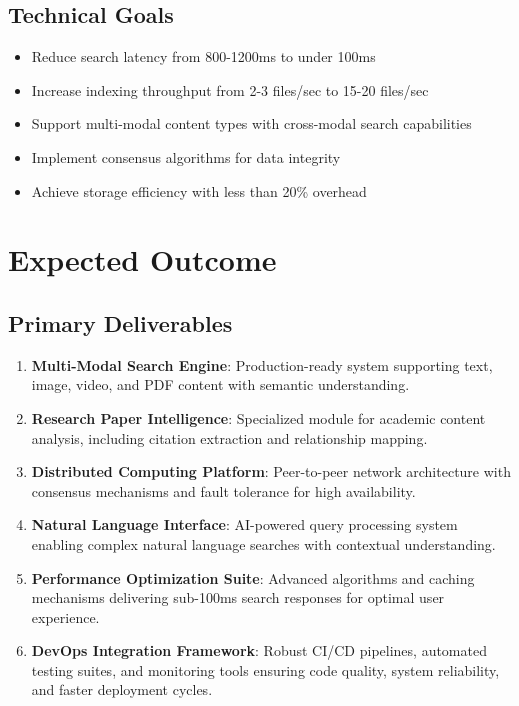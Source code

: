\documentclass[11pt,a4paper]{article}
\begin{document}
\subsection{Technical Goals}
\begin{itemize}
    \item Reduce search latency from 800-1200ms to under 100ms
    \item Increase indexing throughput from 2-3 files/sec to 15-20 files/sec
    \item Support multi-modal content types with cross-modal search capabilities
    \item Implement consensus algorithms for data integrity
    \item Achieve storage efficiency with less than 20\% overhead
\end{itemize}

\section{Expected Outcome}

\subsection{Primary Deliverables}
\begin{enumerate}
    \item \textbf{Multi-Modal Search Engine}: Production-ready system supporting text, image, video, and PDF content with semantic understanding.
    \item \textbf{Research Paper Intelligence}: Specialized module for academic content analysis, including citation extraction and relationship mapping.
    \item \textbf{Distributed Computing Platform}: Peer-to-peer network architecture with consensus mechanisms and fault tolerance for high availability.
    \item \textbf{Natural Language Interface}: AI-powered query processing system enabling complex natural language searches with contextual understanding.
    \item \textbf{Performance Optimization Suite}: Advanced algorithms and caching mechanisms delivering sub-100ms search responses for optimal user experience.
    \item \textbf{DevOps Integration Framework}: Robust CI/CD pipelines, automated testing suites, and monitoring tools ensuring code quality, system reliability, and faster deployment cycles.
\end{enumerate}
\end{document}
